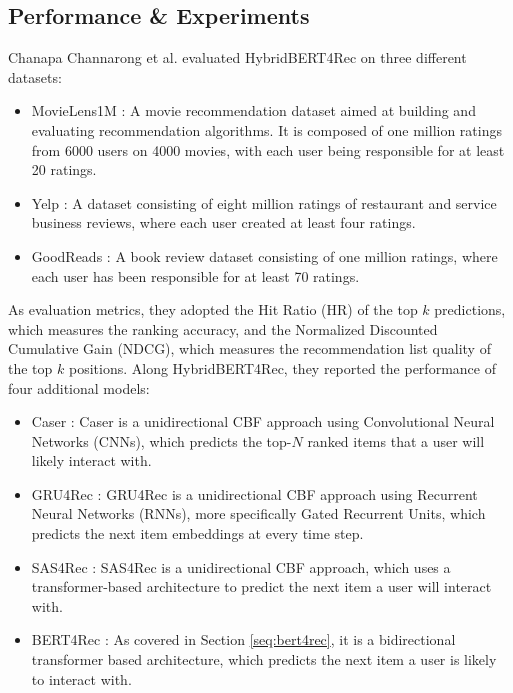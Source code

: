\documentclass{Academic}
\begin{document}
        \subsection{Performance \& Experiments}
        Chanapa Channarong et al. \cite{channarongHybridBERT4RecHybridContentBased2022} evaluated HybridBERT4Rec on three different datasets:
        \begin{itemize}
            \item MovieLens1M \cite{MovieLens1MDataset2015}: A movie recommendation dataset aimed at building and evaluating recommendation algorithms. It is composed of one million ratings from 6000 users on 4000 movies, with each user being responsible for at least 20 ratings.
            \item Yelp \cite{YelpDataset}: A dataset consisting of eight million ratings of restaurant and service business reviews, where each user created at least four ratings.
            \item GoodReads \cite{wanFineGrainedSpoilerDetection2019}: A book review dataset consisting of one million ratings, where each user has been responsible for at least 70 ratings.
        \end{itemize}
        As evaluation metrics, they adopted the Hit Ratio (HR) of the top $k$ predictions, which measures the ranking accuracy, and the Normalized Discounted Cumulative Gain (NDCG), which measures the recommendation list quality of the top $k$ positions. Along HybridBERT4Rec, they reported the performance of four additional models:
        \begin{itemize}
            \item Caser \cite{tangPersonalizedTopNSequential2018}: Caser is a unidirectional CBF approach using Convolutional Neural Networks (CNNs), which predicts the top-$N$ ranked items that a user will likely interact with.
            \item GRU4Rec \cite{hidasiSessionbasedRecommendationsRecurrent2016}: GRU4Rec is a unidirectional CBF approach using Recurrent Neural Networks (RNNs), more specifically Gated Recurrent Units, which predicts the next item embeddings at every time step.
            \item SAS4Rec \cite{kangSelfAttentiveSequentialRecommendation2018}: SAS4Rec is a unidirectional CBF approach, which uses a transformer-based architecture to predict the next item a user will interact with.
            \item BERT4Rec \cite{sunBERT4RecSequentialRecommendation2019}: As covered in Section \ref{seq:bert4rec}, it is a bidirectional transformer based architecture, which predicts the next item a user is likely to interact with. 
        \end{itemize}
\end{document}
